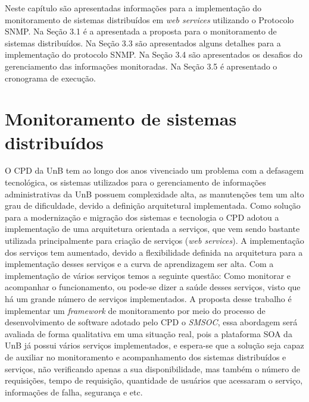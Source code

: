 \label{proposta}

Neste capítulo são apresentadas informações para a implementação do monitoramento de sistemas distribuídos em \textit{web services} utilizando o Protocolo SNMP. Na Seção 3.1 é a apresentada a proposta para o monitoramento de sistemas distribuídos. Na Seção 3.3 são apresentados alguns detalhes para a implementação do protocolo SNMP. Na Seção 3.4 são apresentados os desafios do gerenciamento das informações monitoradas. Na Seção 3.5 é apresentado o cronograma de execução.

\section{Monitoramento de sistemas distribuídos}%

O CPD da \acrlong{UnB} tem ao longo dos anos vivenciado um problema com a defasagem tecnológica, os sistemas utilizados para o gerenciamento de informações administrativas da UnB possuem complexidade alta, as manutenções tem um alto grau de dificuldade, devido a definição arquitetural implementada. Como solução para a modernização e migração dos sistemas e tecnologia o CPD adotou a implementação de uma arquitetura orientada a serviços, que vem sendo bastante utilizada principalmente para criação de serviços (\textit{web services}). A implementação dos serviços tem aumentado, devido a flexibilidade definida na arquitetura para a implementação desses serviços e a curva de aprendizagem ser alta. Com a implementação de vários serviços temos a seguinte questão: Como monitorar e acompanhar o funcionamento, ou pode-se dizer a saúde desses serviços, visto que há um grande número de serviços implementados. A proposta desse trabalho é implementar um \textit{framework} de monitoramento por meio do processo de desenvolvimento de software adotado pelo \acrshort{CPD} o \textit{\acrfull{SMSOC}}\cite{Agilar}, essa abordagem será avaliada de forma qualitativa em uma situação real, pois a plataforma \acrshort{SOA} da \acrshort{UnB} já possui vários serviços implementados, e espera-se que a solução seja capaz de auxiliar no monitoramento e acompanhamento dos sistemas distribuídos e serviços, não verificando apenas a sua disponibilidade, mas também o número de requisições, tempo de requisição, quantidade de usuários que acessaram o serviço, informações de falha, segurança e etc.            

